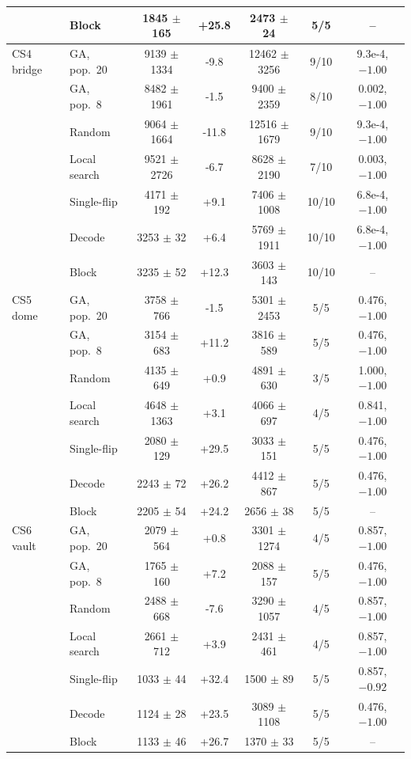 \begin{table}[!htbp]
\begin{tabular}{llccccc}
 & Block & 1845 $\pm$ 165 & +25.8 & 2473 $\pm$ 24 & 5/5 & -- \\
\midrule
CS4 bridge & GA, pop.\ 20 & 9139 $\pm$ 1334 & -9.8 & 12462 $\pm$ 3256 & 9/10 & 9.3e-4, $-1.00$ \\
 & GA, pop.\ 8 & 8482 $\pm$ 1961 & -1.5 & 9400 $\pm$ 2359 & 8/10 & 0.002, $-1.00$ \\
 & Random & 9064 $\pm$ 1664 & -11.8 & 12516 $\pm$ 1679 & 9/10 & 9.3e-4, $-1.00$ \\
 & Local search & 9521 $\pm$ 2726 & -6.7 & 8628 $\pm$ 2190 & 7/10 & 0.003, $-1.00$ \\
 & Single-flip & 4171 $\pm$ 192 & +9.1 & 7406 $\pm$ 1008 & 10/10 & 6.8e-4, $-1.00$ \\
 & Decode & 3253 $\pm$ 32 & +6.4 & 5769 $\pm$ 1911 & 10/10 & 6.8e-4, $-1.00$ \\
 & Block & 3235 $\pm$ 52 & +12.3 & 3603 $\pm$ 143 & 10/10 & -- \\
\midrule
CS5 dome & GA, pop.\ 20 & 3758 $\pm$ 766 & -1.5 & 5301 $\pm$ 2453 & 5/5 & 0.476, $-1.00$ \\
 & GA, pop.\ 8 & 3154 $\pm$ 683 & +11.2 & 3816 $\pm$ 589 & 5/5 & 0.476, $-1.00$ \\
 & Random & 4135 $\pm$ 649 & +0.9 & 4891 $\pm$ 630 & 3/5 & 1.000, $-1.00$ \\
 & Local search & 4648 $\pm$ 1363 & +3.1 & 4066 $\pm$ 697 & 4/5 & 0.841, $-1.00$ \\
 & Single-flip & 2080 $\pm$ 129 & +29.5 & 3033 $\pm$ 151 & 5/5 & 0.476, $-1.00$ \\
 & Decode & 2243 $\pm$ 72 & +26.2 & 4412 $\pm$ 867 & 5/5 & 0.476, $-1.00$ \\
 & Block & 2205 $\pm$ 54 & +24.2 & 2656 $\pm$ 38 & 5/5 & -- \\
\midrule
CS6 vault & GA, pop.\ 20 & 2079 $\pm$ 564 & +0.8 & 3301 $\pm$ 1274 & 4/5 & 0.857, $-1.00$ \\
 & GA, pop.\ 8 & 1765 $\pm$ 160 & +7.2 & 2088 $\pm$ 157 & 5/5 & 0.476, $-1.00$ \\
 & Random & 2488 $\pm$ 668 & -7.6 & 3290 $\pm$ 1057 & 4/5 & 0.857, $-1.00$ \\
 & Local search & 2661 $\pm$ 712 & +3.9 & 2431 $\pm$ 461 & 4/5 & 0.857, $-1.00$ \\
 & Single-flip & 1033 $\pm$ 44 & +32.4 & 1500 $\pm$ 89 & 5/5 & 0.857, $-0.92$ \\
 & Decode & 1124 $\pm$ 28 & +23.5 & 3089 $\pm$ 1108 & 5/5 & 0.476, $-1.00$ \\
 & Block & 1133 $\pm$ 46 & +26.7 & 1370 $\pm$ 33 & 5/5 & -- \\
\bottomrule
\end{tabular}
\normalsize
\end{table}
